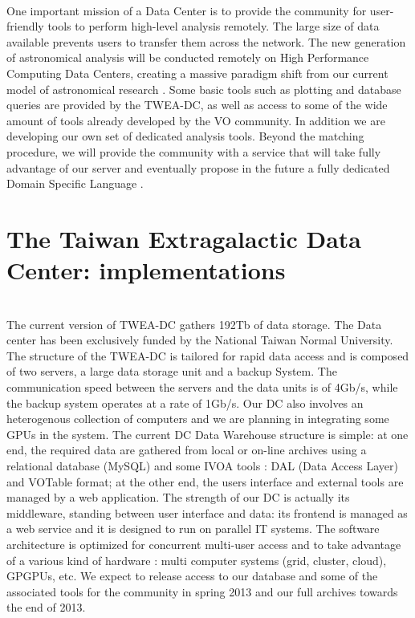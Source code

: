 \\
One important mission of a Data Center is to provide the community for user-friendly tools to perform high-level analysis remotely. The large size of data available prevents users to transfer them across the network. The new generation of astronomical analysis will be conducted remotely on High Performance Computing Data Centers, creating a massive paradigm shift from our current model of astronomical research \citep[the {\it Fourth Paradigm} -][]{fourthpar}.
Some basic tools such as plotting and database queries are provided by the TWEA-DC, as well as access to some of the wide amount of tools already developed by the VO community. In addition we are developing our own set of dedicated analysis tools. Beyond the matching procedure, we will provide the community with a service that will take fully advantage of our server and eventually propose in the future a fully dedicated Domain Specific Language \citep{O18_adassxxii}.

\section{The Taiwan Extragalactic Data Center: implementations}

\\
The current version of TWEA-DC gathers 192Tb of data storage. The Data center has been exclusively funded by the National Taiwan Normal University.  The structure of the TWEA-DC is tailored for rapid data access and is composed of two servers, a large data storage unit and a backup System. The communication speed between the servers and the data units is of 4Gb/s, while the backup system operates at a rate of 1Gb/s. Our DC also involves an heterogenous collection of computers and we are planning in integrating some GPUs in the system. The current DC Data Warehouse structure is simple: at one end, the required data are gathered from local or on-line archives using a relational database (MySQL) and some IVOA tools : DAL (Data Access Layer) and VOTable format; at the other end, the users interface and external tools are managed by a web application. The strength of our DC is actually its middleware, standing between user interface and data: its frontend is managed as a web service and it is designed to run on parallel IT systems. The software architecture is optimized for concurrent multi-user access and to take advantage of a various kind of hardware : multi computer systems (grid, cluster, cloud), GPGPUs, etc.
We expect to release access to our database and some of the associated tools for the community in spring 2013 and our full archives towards the end of 2013.\\

